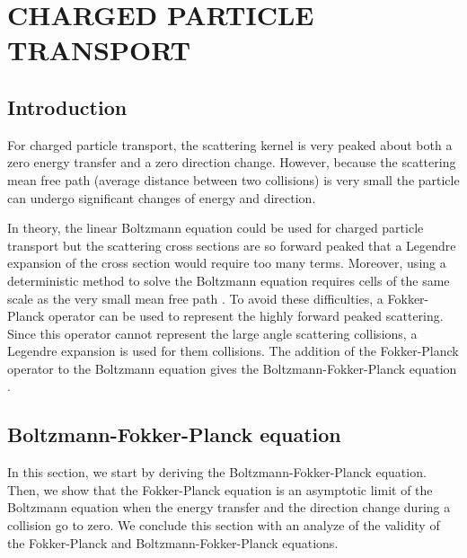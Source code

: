 \chapter{\uppercase{Charged particle transport}}
\section{Introduction}
For charged particle transport, the scattering kernel is very peaked about both
a zero energy transfer and a zero direction change. However, because the
scattering mean free path (average distance between two collisions) is very
small the particle can undergo significant changes of energy and direction.

In theory, the linear Boltzmann equation could be used for charged particle
transport but the scattering cross sections are so forward peaked that a Legendre 
expansion of the cross section would require too many terms. Moreover, using a
deterministic method to solve the Boltzmann equation requires cells of
the same scale as the very small mean free path \cite{pomraning}. 
To avoid these difficulties, a Fokker-Planck operator can
be used to represent the highly forward peaked scattering. Since this operator 
cannot represent the large angle scattering collisions, a Legendre expansion 
is used for them collisions. The addition of the Fokker-Planck operator to the 
Boltzmann equation gives the Boltzmann-Fokker-Planck equation \cite{ligou}.

\section{Boltzmann-Fokker-Planck equation}
In this section, we start by deriving the Boltzmann-Fokker-Planck equation.
Then, we show that the Fokker-Planck equation is an asymptotic limit of the Boltzmann
equation when the energy transfer and the direction change during a collision go 
to zero. We conclude this section with an analyze of the validity of the 
Fokker-Planck and Boltzmann-Fokker-Planck equations.
